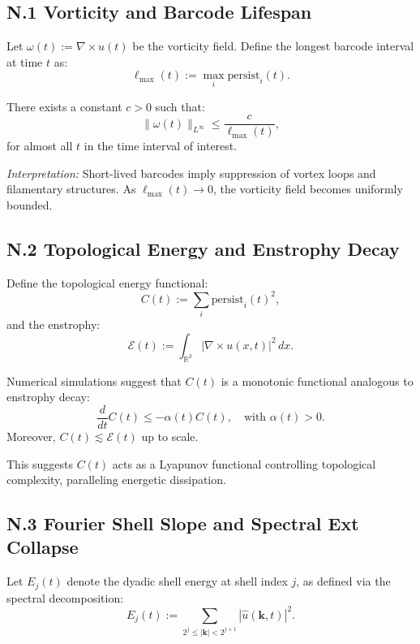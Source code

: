 \documentclass[11pt]{article}
\theoremstyle{definition}
\begin{document}
\subsection*{N.1 Vorticity and Barcode Lifespan}

Let \( \omega(t) := \nabla \times u(t) \) be the vorticity field. Define the longest barcode interval at time \( t \) as:
\[
\ell_{\max}(t) := \max_{i} \mathrm{persist}_i(t).
\]

\begin{conjecture}
There exists a constant \( c > 0 \) such that:
\[
\|\omega(t)\|_{L^\infty} \leq \frac{c}{\ell_{\max}(t)},
\]
for almost all \( t \) in the time interval of interest.
\end{conjecture}

\textit{Interpretation:} Short-lived barcodes imply suppression of vortex loops and filamentary structures. As \( \ell_{\max}(t) \to 0 \), the vorticity field becomes uniformly bounded.

\subsection*{N.2 Topological Energy and Enstrophy Decay}

Define the topological energy functional:
\[
C(t) := \sum_i \mathrm{persist}_i(t)^2,
\]
and the enstrophy:
\[
\mathcal{E}(t) := \int_{\mathbb{R}^3} |\nabla \times u(x,t)|^2 \, dx.
\]

\begin{observation}
Numerical simulations suggest that \( C(t) \) is a monotonic functional analogous to enstrophy decay:
\[
\frac{d}{dt} C(t) \leq -\alpha(t) C(t), \quad \text{with } \alpha(t) > 0.
\]
Moreover, \( C(t) \lesssim \mathcal{E}(t) \) up to scale.
\end{observation}

This suggests \( C(t) \) acts as a Lyapunov functional controlling topological complexity, paralleling energetic dissipation.

\subsection*{N.3 Fourier Shell Slope and Spectral Ext Collapse}

Let \( E_j(t) \) denote the dyadic shell energy at shell index \( j \), as defined via the spectral decomposition:
\[
E_j(t) := \sum_{2^j \leq |\mathbf{k}| < 2^{j+1}} |\hat{u}(\mathbf{k},t)|^2.
\]
\end{document}
